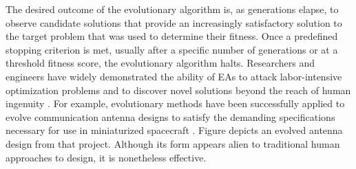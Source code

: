 The desired outcome of the evolutionary algorithm is, as generations elapse, to observe candidate solutions that provide an increasingly satisfactory solution to the target problem that was used to determine their fitness. Once a predefined stopping criterion is met, usually after a specific number of generations or at a threshold fitness score, the evolutionary algorithm halts. Researchers and engineers have widely demonstrated the ability of EAs to attack labor-intensive optimization problems and to discover novel solutions beyond the reach of human ingenuity \cite{Poli2008AProgramming}. For example, evolutionary methods have been successfully applied to evolve communication antenna designs to satisfy the demanding specifications necessary for use in miniaturized spacecraft  \cite{Hornby2006AutomatedAlgorithms}. Figure  depicts an evolved antenna design from that project. Although its form appears alien to traditional human approaches to design, it is nonetheless effective.


